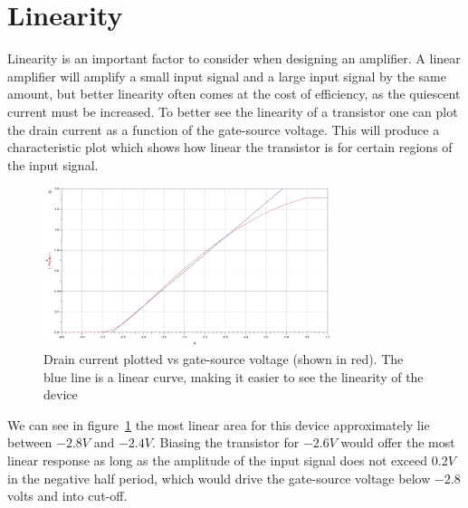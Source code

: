 \section{Linearity}
Linearity is an important factor to consider when designing an amplifier. A linear amplifier will amplify a small input signal and a large input signal by the same amount, but better linearity often comes at the cost of efficiency, as the quiescent current must be increased. To better see the linearity of a transistor one can plot the drain current as a function of the gate-source voltage. This will produce a characteristic plot which shows how linear the transistor is for certain regions of the input signal.
\begin{figure}[h]
	  \centering
	  \includegraphics[width=0.75\textwidth]{img/Linearity_curve}
	  \caption{Drain current plotted vs gate-source voltage (shown in red). The blue line is a linear curve, making it easier to see the linearity of the device}
	  \label{fig:fig_Linearity_line}
\end{figure}
We can see in figure~\ref{fig:fig_Linearity_line} the most linear area for this device approximately lie between $-2.8V$ and $-2.4V$. Biasing the transistor for $-2.6V$ would offer the most linear response as long as the amplitude of the input signal does not exceed $0.2V$ in the negative half period, which would drive the gate-source voltage below $-2.8$ volts and into cut-off. 

